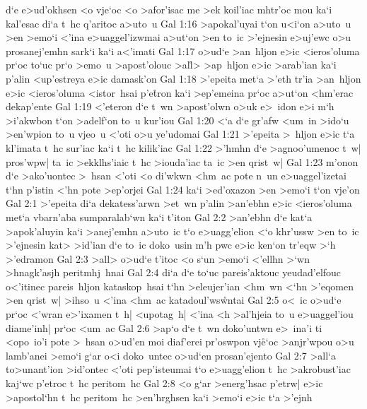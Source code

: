 d`e
e>ud'okhsen
<o
vje`oc
<o
>afor'isac
me
>ek
koil'iac
mhtr'oc
mou
ka`i
kal'esac
di`a
t~hc
q'aritoc
a>uto~u\bibvsend
\vs Gal 1:16
>apokal'uyai
t`on
u<i`on
a>uto~u
>en
>emo`i
<'ina
e>uaggel'izwmai
a>ut`on
>en
to~ic
>'ejnesin
e>uj'ewc
o>u
prosanej'emhn
sark`i
ka`i
a<'imati\bibvsend
\vs Gal 1:17
o>ud`e
>an~hljon
e>ic
<ieros'oluma
pr`oc
to`uc
pr`o
>emo~u
>apost'olouc
>al\r{l}>
>ap~hljon
e>ic
>arab'ian
ka`i
p'alin
<up'estreya
e>ic
damask'on\bibvsend
\vs Gal 1:18
>'epeita
met`a
>'eth
tr'ia
>an~hljon
e>ic
<ieros'oluma
<istor~hsai
p'e\r{t}ron
ka`i
>ep'emeina
pr`oc
a>ut`on
<hm'erac
dekap'ente\bibvsend
\vs Gal 1:19
<'eteron
d`e
t~wn
>apost'olwn
o>uk
e>~idon
e>i
m`h
>i'akwbon
t`on
>adelf`on
to~u
kur'iou\bibvsend
\vs Gal 1:20
<`a
d`e
gr'afw
<um~in
>ido`u
>en'wpion
to~u
vjeo~u
<'oti
o>u
ye'udomai\bibvsend
\vs Gal 1:21
>'epeita
>~hljon
e>ic
t`a
kl'imata
t~hc
sur'iac
ka`i
t~hc
kilik'iac\bibvsend
\vs Gal 1:22
>'hmhn
d`e
>agnoo'umenoc
t~w|
pros'wpw|
ta~ic
>ekklhs'iaic
t~hc
>iouda'iac
ta~ic
>en
qrist~w|\bibvsend
\vs Gal 1:23
m'onon
d`e
>ako'uontec
>~hsan
<'oti
<o
di'wkwn
<hm~ac
pote
n~un
e>uaggel'izetai
t`hn
p'istin
<'hn
pote
>ep'orjei\bibvsend
\vs Gal 1:24
ka`i
>ed'oxazon
>en
>emo`i
t`on
vje'on\bibvsend
\vs Gal 2:1
>'epeita
di`a
dekatess'arwn
>et~wn
p'alin
>an'ebhn
e>ic
<ieros'oluma
met`a
vbarn'aba
sumparalab`wn
ka`i
t'iton\bibvsend
\vs Gal 2:2
>an'ebhn
d`e
kat`a
>apok'aluyin
ka`i
>anej'emhn
a>uto~ic
t`o
e>uagg'elion
<`o
khr'ussw
>en
to~ic
>'ejnesin
kat>
>id'ian
d`e
to~ic
doko~usin
m'h
pwc
e>ic
ken`on
tr'eqw
>`h
>'edramon\bibvsend
\vs Gal 2:3
>all>
o>ud`e
t'itoc
<o
s`un
>emo`i
<'ellhn
>`wn
>hnagk'asjh
peritmhj~hnai\bibvsend
\vs Gal 2:4
di`a
d`e
to`uc
pareis'aktouc
yeudad'elfouc
o<'itinec
pareis~hljon
kataskop~hsai
t`hn
>eleujer'ian
<hm~wn
<`hn
>'eqomen
>en
qrist~w|
>ihso~u
<'ina
<hm~ac
katadoul'ws\r{w}ntai\bibvsend
{}
\vs Gal 2:5
o<~ic
o>ud`e
pr`oc
<'wran
e>'ixamen
t~h|
<upotag~h|
<'ina
<h
>al'hjeia
to~u
e>uaggel'iou
diame'inh|
pr`oc
<um~ac\bibvsend
\vs Gal 2:6
>ap`o
d`e
t~wn
doko'untwn
e>~ina'i
ti
<opo~io'i
pote
>~hsan
o>ud'en
moi
diaf'erei
pr'oswpon
vj\r{e}`oc
>anjr'wpou
o>u
lamb'anei
>emo`i
g`ar
o<i
doko~untec
o>ud`en
prosan'ejento\bibvsend
\vs Gal 2:7
>all`a
to>unant'ion
>id'ontec
<'oti
pep'isteumai
t`o
e>uagg'elion
t~hc
>akrobust'iac
kaj`wc
p'etroc
t~hc
peritom~hc\bibvsend
\vs Gal 2:8
<o
g`ar
>energ'hsac
p'etrw|
e>ic
>apostol`hn
t~hc
peritom~hc
>en'hrghsen
ka`i
>emo`i
e>ic
t`a
>'ejnh\bibvsend
